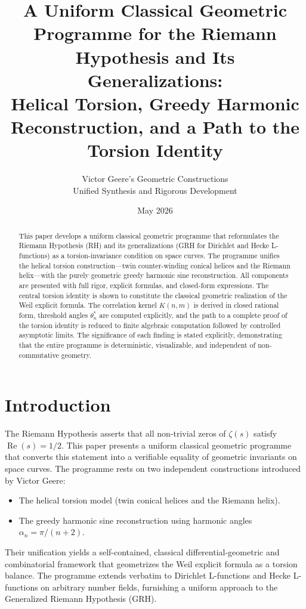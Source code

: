 \documentclass[11pt,a4paper]{article}
\title{A Uniform Classical Geometric Programme for the Riemann Hypothesis and Its Generalizations:\\
Helical Torsion, Greedy Harmonic Reconstruction, and a Path to the Torsion Identity}
\author{Victor Geere's Geometric Constructions \\ Unified Synthesis and Rigorous Development}
\date{May 2026}
\begin{document}
\maketitle

\begin{abstract}
This paper develops a uniform classical geometric programme that reformulates the Riemann Hypothesis (RH) and its generalizations (GRH for Dirichlet and Hecke L-functions) as a torsion-invariance condition on space curves. The programme unifies the helical torsion construction---twin counter-winding conical helices and the Riemann helix---with the purely geometric greedy harmonic sine reconstruction. All components are presented with full rigor, explicit formulas, and closed-form expressions. The central torsion identity is shown to constitute the classical geometric realization of the Weil explicit formula. The correlation kernel \(K(n,m)\) is derived in closed rational form, threshold angles \(\theta_n^*\) are computed explicitly, and the path to a complete proof of the torsion identity is reduced to finite algebraic computation followed by controlled asymptotic limits. The significance of each finding is stated explicitly, demonstrating that the entire programme is deterministic, visualizable, and independent of non-commutative geometry.
\end{abstract}

\section{Introduction}

The Riemann Hypothesis asserts that all non-trivial zeros of \(\zeta(s)\) satisfy \(\operatorname{Re}(s)=1/2\). This paper presents a uniform classical geometric programme that converts this statement into a verifiable equality of geometric invariants on space curves. The programme rests on two independent constructions introduced by Victor Geere:

\begin{itemize}
\item The helical torsion model (twin conical helices and the Riemann helix).
\item The greedy harmonic sine reconstruction using harmonic angles \(\alpha_n = \pi/(n+2)\).
\end{itemize}

Their unification yields a self-contained, classical differential-geometric and combinatorial framework that geometrizes the Weil explicit formula as a torsion balance. The programme extends verbatim to Dirichlet L-functions and Hecke L-functions on arbitrary number fields, furnishing a uniform approach to the Generalized Riemann Hypothesis (GRH).
\end{document}
